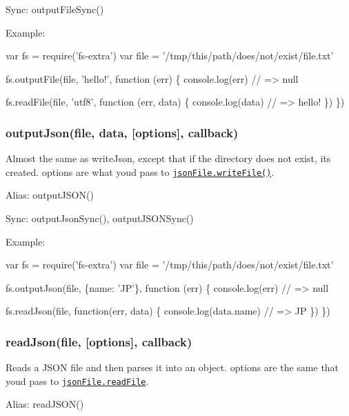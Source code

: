 Sync\+: {\ttfamily output\+File\+Sync()}

Example\+:


\begin{DoxyCode}
var fs = require('fs-extra')
var file = '/tmp/this/path/does/not/exist/file.txt'

fs.outputFile(file, 'hello!', function (err) \{
  console.log(err) // => null

  fs.readFile(file, 'utf8', function (err, data) \{
    console.log(data) // => hello!
  \})
\})
\end{DoxyCode}


\subsubsection*{output\+Json(file, data, \mbox{[}options\mbox{]}, callback)}

Almost the same as {\ttfamily write\+Json}, except that if the directory does not exist, it\textquotesingle{}s created. {\ttfamily options} are what you\textquotesingle{}d pass to \href{https://github.com/jprichardson/node-jsonfile#writefilefilename-options-callback}{\tt {\ttfamily json\+File.\+write\+File()}}.

Alias\+: {\ttfamily output\+J\+S\+O\+N()}

Sync\+: {\ttfamily output\+Json\+Sync()}, {\ttfamily output\+J\+S\+O\+N\+Sync()}

Example\+:


\begin{DoxyCode}
var fs = require('fs-extra')
var file = '/tmp/this/path/does/not/exist/file.txt'

fs.outputJson(file, \{name: 'JP'\}, function (err) \{
  console.log(err) // => null

  fs.readJson(file, function(err, data) \{
    console.log(data.name) // => JP
  \})
\})
\end{DoxyCode}


\subsubsection*{read\+Json(file, \mbox{[}options\mbox{]}, callback)}

Reads a J\+S\+ON file and then parses it into an object. {\ttfamily options} are the same that you\textquotesingle{}d pass to \href{https://github.com/jprichardson/node-jsonfile#readfilefilename-options-callback}{\tt {\ttfamily json\+File.\+read\+File}}.

Alias\+: {\ttfamily read\+J\+S\+O\+N()}

